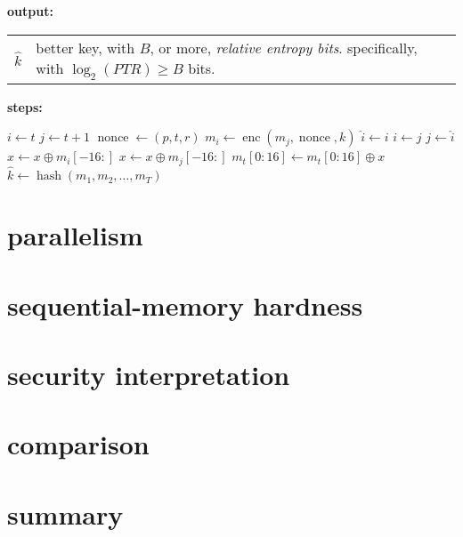 \documentclass{article}
\DeclareMathOperator{\enc}{enc}
\DeclareMathOperator{\nonce}{nonce}
\DeclareMathOperator{\hash}{hash}
\begin{document}
\begin{multicols}{2}
\noindent\textbf{output:}

\begin{tabular}{lp{18em}}
$\hat k$ & better key, with $B$, or more, \emph{relative entropy bits}.
specifically, with $\log_2(PTR) \ge B$ bits.\\
\end{tabular}

\noindent\textbf{steps:}

\begin{algorithmic}[1]
            \STATE $i \leftarrow t$
            \STATE $j \leftarrow t+1$
                \STATE $\nonce \leftarrow (p, t, r)$
                \STATE $m_i \leftarrow \enc(m_j, \nonce, k)$
                \STATE $\hat i \leftarrow i$
                \STATE $i \leftarrow j$
                \STATE $j \leftarrow \hat i$
            \ENDFOR
            \STATE $x \leftarrow x \oplus m_i[-16:]$
            \STATE $x \leftarrow x \oplus m_j[-16:]$
        \ENDFOR
            \STATE $m_t[0:16] \leftarrow m_t[0:16] \oplus x$
        \ENDFOR
    \ENDFOR
    \RETURN $\hat k \leftarrow \hash(m_1, m_2, \ldots, m_T)$
\end{algorithmic}
\vfill\null
\columnbreak

\section{parallelism}
\section{sequential-memory hardness}
\section{security interpretation}
\section{comparison}
\section{summary}

\end{multicols}
\end{document}

